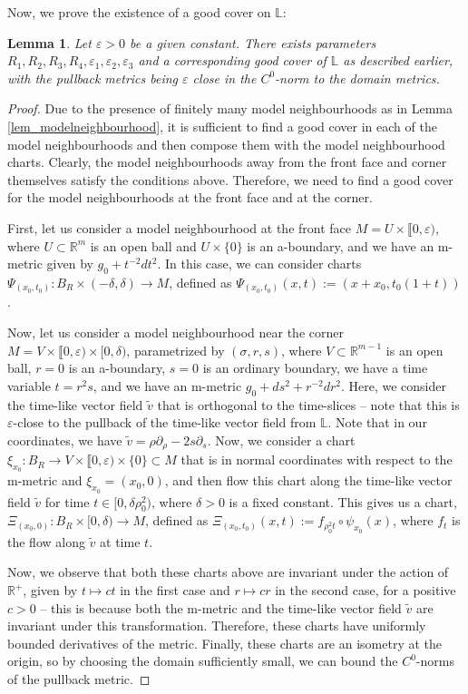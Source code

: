 \documentclass[10pt, a4paper]{article}
\theoremstyle{plain}%
\newtheorem{lem}[theorem]{Lemma}
\theoremstyle{definition}
\numberwithin{figure}{section}
\numberwithin{equation}{section}
\newcommand{\bL}{\mathbb{L}}
\newcommand{\bR}{\mathbb{R}}
\newcommand{\pa}{\partial}
\newcommand{\rt}{\rightarrow}
\newcommand{\ep}{\varepsilon}
\begin{document}
Now, we prove the existence of a good cover on $\bL$:
\begin{lem}
	Let $\ep >0$ be a given constant. There exists parameters $R_1,R_2,R_3,R_4,\ep_1,\ep_2,\ep_3$ and a corresponding good cover of $\bL$ as described earlier, with the pullback metrics being $\ep$ close in the $C^0$-norm to the domain metrics.
\end{lem}
\begin{proof}
	
	Due to the presence of finitely many model neighbourhoods as in Lemma \ref{lem_modelneighbourhood}, it is sufficient to find a good cover in each of the model neighbourhoods and then compose them with the model neighbourhood charts. Clearly, the model neighbourhoods away from the front face and corner themselves satisfy the conditions above. Therefore, we need to find a good cover for the model neighbourhoods at the front face and at the corner. 
	
	First, let us consider a model neighbourhood at the front face $M = U\times\llbracket0,\varepsilon)$, where $U\subset \bR^m$ is an open ball and $U\times \{0\}$ is an a-boundary, and we have an m-metric given by $g_0 + t^{-2}dt^2$. In this case, we can consider charts $\Psi_{(x_0,t_0)}: B_R\times (-\delta,\delta)\rt M$, defined as $\Psi_{(x_0,t_0)}(x,t):=(x+x_0, t_0(1+t))$.
	
	Now, let us consider a model neighbourhood near the corner $M = V\times \llbracket0,\varepsilon)\times [0,\delta)$, parametrized by $(\sigma,r,s)$, where $V\subset \bR^{m-1}$ is an open ball, $r=0$ is an a-boundary, $s=0$ is an ordinary boundary, we have a time variable $t=r^2s$, and we have an m-metric $g_0+ds^2+r^{-2}dr^2$. Here, we consider the time-like vector field $\tilde{v}$ that is orthogonal to the time-slices -- note that this is $\ep$-close to the pullback of the time-like vector field from $\bL$. Note that in our coordinates, we have $\tilde{v}=\rho\pa_\rho-2s\pa_s$. Now, we consider a chart $\xi_{x_0}:B_R\rt V\times \llbracket 0,\ep) \times \{0\}\subset M$ that is in normal coordinates with respect to the m-metric and $\xi_{x_0}=(x_0,0)$, and then flow this chart along the time-like vector field $\tilde{v}$ for time $t\in [0,\delta \rho_0^2)$, where $\delta>0$ is a fixed constant. This gives us a chart, $\Xi_{(x_0,0)}: B_R\times [0,\delta)\rt M$, defined as $\Xi_{(x_0,t_0)}(x,t):= f_{\rho_0^2t}\circ \psi_{x_0}(x)$, where $f_t$ is the flow along $\tilde{v}$ at time $t$. 
	
	Now, we observe that both these charts above are invariant under the action of $\bR^+$, given by $t\mapsto ct$ in the first case and $r \mapsto cr$ in the second case, for a positive $c>0$ -- this is because both the m-metric and the time-like vector field $\tilde{v}$ are invariant under this transformation. Therefore, these charts have uniformly bounded derivatives of the metric. Finally, these charts are an isometry at the origin, so by choosing the domain sufficiently small, we can bound the $C^0$-norms of the pullback metric. 
	

\end{proof}
\end{document}
